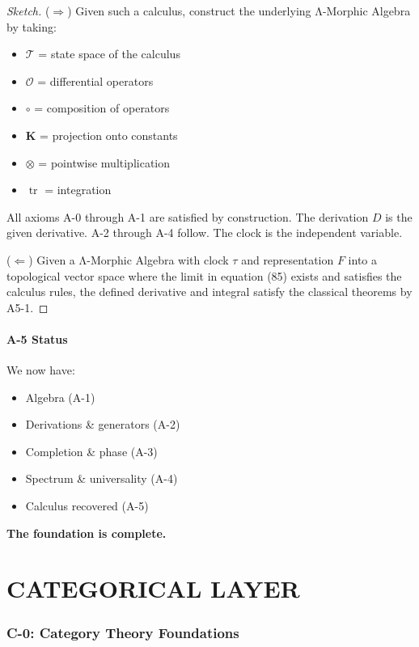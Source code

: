 \documentclass[12pt, oneside]{article}
\DeclareMathOperator{\tr}{tr}
\newcommand{\K}{\mathbf{K}}
\newcommand{\T}{\mathcal{T}}
\newcommand{\Opr}{\mathcal{O}}
\begin{document}
\begin{proof}[Sketch]
($\Rightarrow$) Given such a calculus, construct the underlying Λ-Morphic Algebra by taking:
\begin{itemize}
    \item $\T$ = state space of the calculus
    \item $\Opr$ = differential operators
    \item $\circ$ = composition of operators
    \item $\K$ = projection onto constants
    \item $\otimes$ = pointwise multiplication
    \item $\tr$ = integration
\end{itemize}
All axioms A-0 through A-1 are satisfied by construction. The derivation $D$ is the given derivative. A-2 through A-4 follow. The clock is the independent variable.

($\Leftarrow$) Given a Λ-Morphic Algebra with clock $\tau$ and representation $F$ into a topological vector space where the limit in equation (85) exists and satisfies the calculus rules, the defined derivative and integral satisfy the classical theorems by A5-1.
\end{proof}

\subsection{A-5 Status}

We now have:
\begin{itemize}
    \item Algebra (A-1)
    \item Derivations \& generators (A-2)
    \item Completion \& phase (A-3)
    \item Spectrum \& universality (A-4)
    \item Calculus recovered (A-5)
\end{itemize}
\textbf{The foundation is complete.}

\newpage

\part{CATEGORICAL LAYER}

\section{C-0: Category Theory Foundations}
\end{document}
